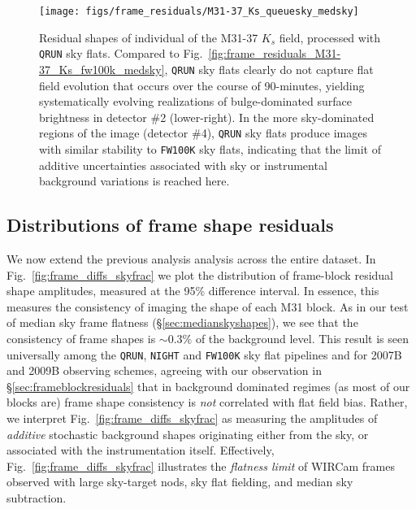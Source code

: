 \documentclass[iop]{emulateapj}
\newcommand{\Fig}[1]{Fig.~\ref{fig:#1}}  %
\newcommand{\Sec}[1]{\S\ref{sec:#1}}  %
\begin{document}
\begin{figure}[p]
\centering
\texttt{[image: figs/frame\_residuals/M31-37\_Ks\_queuesky\_medsky]}
\caption{Residual shapes of individual of the M31-37 $K_s$ field, processed with \texttt{QRUN} sky flats.
Compared to \Fig{frame_residuals_M31-37_Ks_fw100k_medsky}, \texttt{QRUN} sky flats clearly do not capture flat field evolution that occurs over the course of 90-minutes, yielding systematically evolving realizations of bulge-dominated surface brightness in detector \#2 (lower-right). In the more sky-dominated regions of the image (detector \#4), \texttt{QRUN} sky flats produce images with similar stability to \texttt{FW100K} sky flats, indicating that the limit of additive uncertainties associated with sky or instrumental background variations is reached here.}
\label{fig:frame_residuals_M31-37_Ks_QRUN}
\end{figure}

\subsection{Distributions of frame shape residuals}
\label{sec:frameblockresidualhist}

We now extend the previous analysis analysis across the entire dataset.
In \Fig{frame_diffs_skyfrac} we plot the distribution of frame-block residual shape amplitudes, measured at the 95\% difference interval.
In essence, this measures the consistency of imaging the shape of each M31 block.
As in our test of median sky frame flatness (\Sec{medianskyshapes}), we see that the consistency of frame shapes is $\sim 0.3\%$ of the background level.
This result is seen universally among the \texttt{QRUN}, \texttt{NIGHT}  and \texttt{FW100K} sky flat pipelines and for 2007B and 2009B observing schemes, agreeing with our observation in \Sec{frameblockresiduals} that in background dominated regimes (as most of our blocks are) frame shape consistency is \emph{not} correlated with flat field bias.
Rather, we interpret \Fig{frame_diffs_skyfrac} as measuring the amplitudes of \emph{additive} stochastic background shapes originating either from the sky, or associated with the instrumentation itself.
Effectively, \Fig{frame_diffs_skyfrac} illustrates the \emph{flatness limit} of WIRCam frames observed with large sky-target nods, sky flat fielding, and median sky subtraction.
\end{document}
